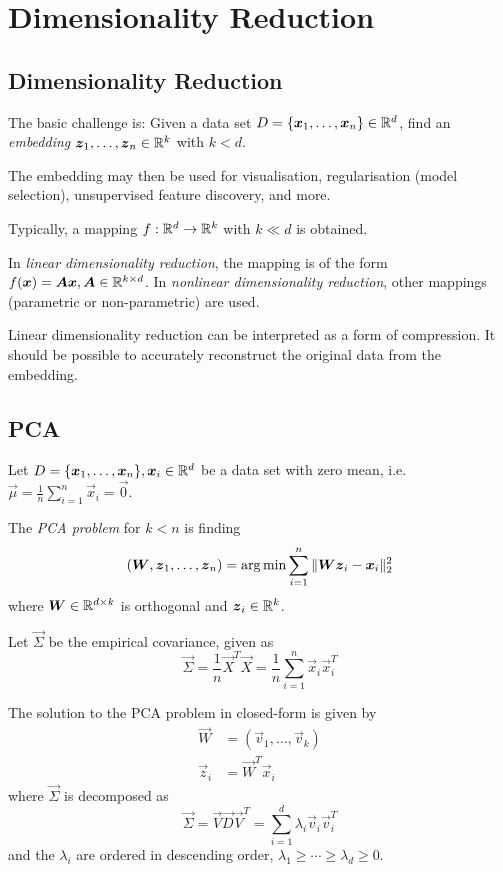 \chapter{Dimensionality Reduction}

\section{Dimensionality Reduction}
The basic challenge is:
Given a data set
$D = \{\boldsymbol{x}_1, \dotsc, \boldsymbol{x}_n\} \in \mathbb{R}^d$,
find an \emph{embedding}
$\boldsymbol{z}_1, \dotsc, \boldsymbol{z}_n \in \mathbb{R}^k$
with $k < d$.

The embedding may then be used for visualisation,
regularisation (model selection),
unsupervised feature discovery,
and more.

Typically, a mapping $f : \mathbb{R}^d \to \mathbb{R}^k$
with $k \ll d$ is obtained.

In \emph{linear dimensionality reduction},
the mapping is of the form
$f(\boldsymbol{x}) = \boldsymbol{A}\boldsymbol{x}, \boldsymbol{A} \in \mathbb{R}^{k \times d}$.
In \emph{nonlinear dimensionality reduction},
other mappings (parametric or non-parametric) are used.

Linear dimensionality reduction can be interpreted as a form of
compression.
It should be possible to accurately reconstruct the original data
from the embedding.


\section{PCA}
Let
$D = \{\boldsymbol{x}_1, \dotsc, \boldsymbol{x}_n\}, \boldsymbol{x}_i \in \mathbb{R}^d$
be a data set with zero mean,
i.e. $\vec{\mu} = \frac{1}{n} \sum_{i=1}^n{\vec{x}_i} = \vec{0}$.

The \emph{PCA problem} for $k < n$ is finding
\begin{equation*}
(\boldsymbol{W}, \boldsymbol{z}_1, \dotsc, \boldsymbol{z}_n) = \arg\min{
	\sum_{i=1}^n{\lVert\boldsymbol{W} \boldsymbol{z}_i - \boldsymbol{x}_i\rVert_2^2}
}
\end{equation*}
where $\boldsymbol{W} \in \mathbb{R}^{d \times k}$ is orthogonal and
$\boldsymbol{z}_i \in \mathbb{R}^k$.

Let $\vec{\Sigma}$ be the empirical covariance, given as
\begin{equation*}
\vec{\Sigma} =
\frac{1}{n} \vec{X}^T \vec{X} =
\frac{1}{n} \sum_{i=1}^n{
	\vec{x}_i \vec{x}_i^T
}
\end{equation*}

The solution to the PCA problem in closed-form is given by
\begin{align*}
\vec{W} &= (\vec{v}_1, \dotsc, \vec{v}_k) \\
\vec{z}_i &= \vec{W}^T \vec{x}_i
\end{align*}
where $\vec{\Sigma}$ is decomposed as
\begin{equation*}
\vec{\Sigma} = \vec{V} \vec{D} \vec{V}^T
= \sum_{i=1}^d{\lambda_i \vec{v}_i \vec{v}_i^T}
\end{equation*}
and the $\lambda_i$ are ordered in descending order,
$\lambda_1 \geq \dotsb \geq \lambda_d \geq 0$.

